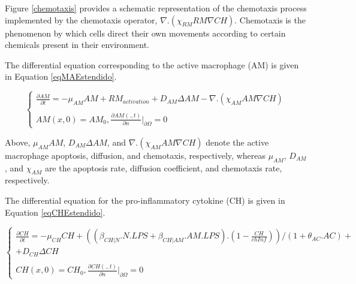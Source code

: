 \documentclass[10pt]{bmc_article}
\newenvironment{bmcformat}{\baselineskip20pt\sloppy\setboolean{publ}{false}}{\baselineskip20pt\sloppy}
\begin{document}
\begin{bmcformat}
Figure \ref{chemotaxis} provides a schematic representation of the chemotaxis process implemented by the chemotaxis operator,  
$\nabla. (\chi_{RM} RM \nabla CH)$. Chemotaxis is the phenomenon by which cells direct their own movements according to certain chemicals 
present in their environment.


The differential equation corresponding to the active macrophage (AM) is given in Equation \ref{eqMAEstendido}.

\begin{equation}
\label{eqMAEstendido}
 \begin{cases} 
\frac{\partial AM}{\partial t} = -\mu_{AM} AM + RM_{activation} + D_{AM} \Delta AM - \nabla. (\chi_{AM} AM \nabla CH)\\\\
AM(x,0) = AM_0, \frac{\partial AM(.,t)}{\partial n} |_{\partial\Omega} = 0 
\end{cases}
\end{equation}


Above, $\mu_{AM} AM$, $D_{AM} \Delta AM$, and $\nabla. (\chi_{AM} AM \nabla CH)$ denote the active macrophage apoptosis, diffusion, 
and chemotaxis, respectively, whereas $\mu_{AM}$, $D_{AM}$, and $\chi_{AM}$ are the apoptosis rate, diffusion coefficient, and chemotaxis 
rate, respectively.

The differential equation for the pro-inflammatory cytokine (CH) is given in Equation \ref{eqCHEstendido}.

\begin{equation}
\label{eqCHEstendido}
\begin{cases} 
\frac{\partial CH}{\partial t} = -\mu_{CH} CH + ((\beta _{CH|N}.N.LPS + \beta _{CH|AM}.AM.LPS).(1 - \frac{CH}{chInf}))/(1 + \theta_{AC}.AC)+ \\
 + D_{CH} \Delta CH \\ \\
CH(x,0) =  CH_0, \frac{\partial CH(.,t)}{\partial n} |_{\partial\Omega} = 0 
\end{cases}
\end{equation}


\end{bmcformat}
\end{document}
